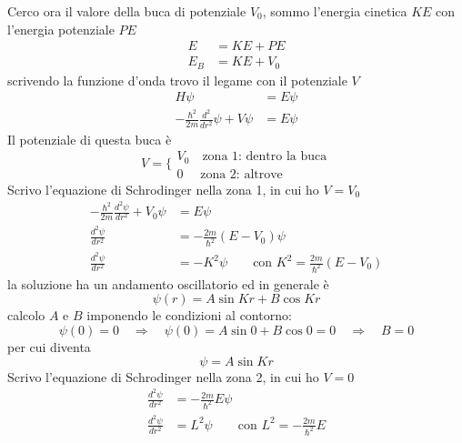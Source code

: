 Cerco ora il valore della buca di potenziale $V_0$, sommo l'energia cinetica $KE$ con l'energia potenziale $PE$
\begin{equation}
\begin{split}
E & = KE + PE \\
E_B & = KE + V_0
\end{split}
\end{equation}
scrivendo la funzione d'onda trovo il legame con il potenziale $V$
\begin{equation}
\begin{split}
H \psi & = E \psi \\
- \frac{\hbar^2}{2m} \frac{d^2}{dr^2} \psi + V \psi & = E \psi
\end{split}
\end{equation}
Il potenziale di questa buca è
\begin{equation}
V = 
\Bigg\{\begin{array}{l}
V_0 \quad\mbox{zona 1: dentro la buca} \\
0 \quad\mbox{ zona 2: altrove}
\end{array}
\end{equation}
Scrivo l'equazione di Schrodinger nella zona 1, in cui ho $V = V_0$
\begin{equation}
\begin{split}
- \frac{\hbar^2}{2m} \frac{d^2 \psi}{d r^2} + V_0 \psi & = E \psi \\
\frac{d^2 \psi}{d r^2} & = -\frac{2m}{\hbar^2} (E - V_0) \psi \\
\frac{d^2 \psi}{d r^2} & = - K^2 \psi \quad\quad \mbox{con } K^2 = \frac{2m}{\hbar^2} (E - V_0)
\end{split}
\end{equation}
la soluzione ha un andamento oscillatorio ed in generale è
\begin{equation}
\psi(r) = A \sin Kr + B \cos Kr
\end{equation}
calcolo $A$ e $B$ imponendo le condizioni al contorno:
\begin{equation}
\psi (0) = 0 \quad\Rightarrow\quad \psi(0) = A \sin 0 + B \cos 0 = 0 \quad\Rightarrow\quad B=0
\end{equation}
per cui diventa
\begin{equation}
\psi = A \sin K r
\label{psi_1}
\end{equation}
Scrivo l'equazione di Schrodinger nella zona 2, in cui ho $V =0$
\begin{equation}
\begin{split}
\frac{d^2 \psi}{d r^2} & = -\frac{2m}{\hbar^2} E \psi \\
\frac{d^2 \psi}{d r^2} & = L^2 \psi \quad\quad \mbox{con } L^2 = - \frac{2m}{\hbar^2} E
\end{split}
\end{equation}
